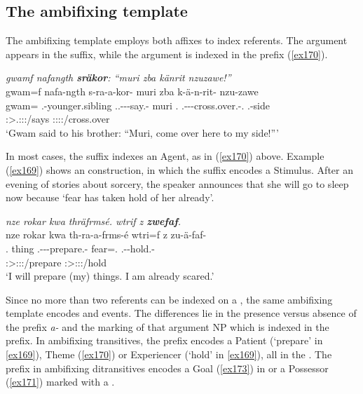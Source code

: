\subsection{The ambifixing template} \label{ambifixingtemp}

The ambifixing template employs both affixes to index referents. The  argument appears in the suffix, while the  argument is indexed in the prefix (\ref{ex170}).

\begin{exe}
	\ex \emph{gwamf nafangth \textbf{sräkor}: ``muri zba känrit nzuzawe!''}\\
	\glll gwam=f nafa-ngth s-ra-a-kor-\Zero{} muri zba k-ä-n-rit-\Zero{} nzu-zawe\\
	gwam=\Erg{} \Third.\Poss-younger.sibling \Tsg.\Masc.\Bet-\Irr-\Ndu-say.\Rs-\Stsg{} muri \Prox.\Abl{} \M.\Bet-\Ndu-\Venit-cross.over.\Rs-\Ssg.\Imp{} \Fsg.\Poss-side\\
	{} {} \footnotesize{\Stsg:\Sbj>\Tsg.\Masc:\Obj:\Irr:\Pfv/says} {} {} \footnotesize{\Ssg:\Sbj:\Imp:\Pfv:\Venit/cross.over} {}\\
	\trans `Gwam said to his brother: ``Muri, come over here to my side!'''\\
	\label{ex170}
\end{exe}

In most cases, the suffix indexes an Agent, as in (\ref{ex170}) above. Example (\ref{ex169}) shows an  construction, in which the suffix encodes a Stimulus. After an evening of stories about sorcery, the speaker announces that she will go to sleep now because `fear has taken hold of her already'.

\begin{exe}
	\ex \emph{nze rokar kwa thräfrmsé. wtrif z \textbf{zwefaf}.}\\
	\glll nze rokar kwa th-ra-a-frms-é wtri=f z zu-ä-faf-\Zero\\
	\Fsg.\Erg{} thing \Fut{} \Stnsg.\Bet-\Irr-\Vc\textbar\Ndu-prepare.\Rs-\Fsg{} fear=\Erg.\Sg{} \Iam{} \Fsg.\Gam-\Ndu-hold.\Rs-\Stsg{}\\
	{} {} {} \footnotesize{\Fsg:\Sbj>\Stpl:\Obj:\Irr:\Pfv/prepare} {} {} \footnotesize{\Stsg:\Sbj>\Fsg:\Obj:\Rpst:\Pfv/hold}\\
	\trans `I will prepare (my) things. I am already scared.'
	\label{ex169}
\end{exe}

Since no more than two referents can be indexed on a , the same ambifixing template encodes  and  events. The differences lie in the presence versus absence of the  prefix \emph{a-} and the  marking of that argument NP which is indexed in the prefix. In ambifixing transitives, the prefix encodes a Patient (`prepare' in \ref{ex169}), Theme (\ref{ex170}) or Experiencer (`hold' in \ref{ex169}), all in the . The prefix in ambifixing ditransitives encodes a Goal (\ref{ex173}) in   or a Possessor (\ref{ex171}) marked with a .

